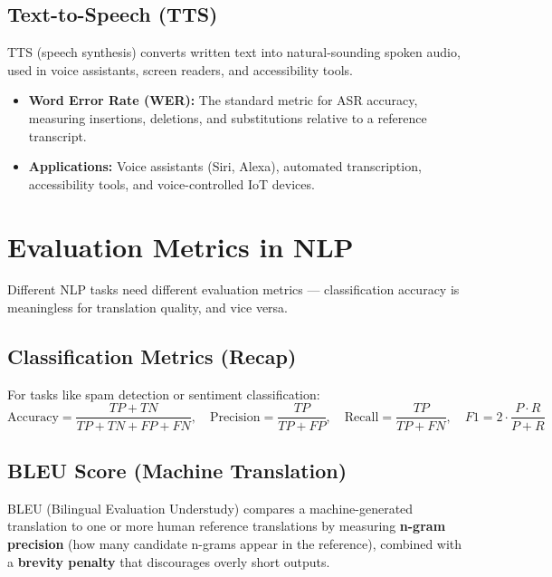 \documentclass[11pt,a4paper]{article}
\begin{document}
\subsection{Text-to-Speech (TTS)}
\begin{conceptbox}[TTS]
TTS (speech synthesis) converts written text into natural-sounding spoken audio, used in voice assistants, screen readers, and accessibility tools.
\end{conceptbox}

\begin{itemize}[leftmargin=*]
  \item \textbf{Word Error Rate (WER):} The standard metric for ASR accuracy, measuring insertions, deletions, and substitutions relative to a reference transcript.
  \item \textbf{Applications:} Voice assistants (Siri, Alexa), automated transcription, accessibility tools, and voice-controlled IoT devices.
\end{itemize}

\section{Evaluation Metrics in NLP}

\begin{definitionbox}
Different NLP tasks need different evaluation metrics --- classification accuracy is meaningless for translation quality, and vice versa.
\end{definitionbox}

\subsection{Classification Metrics (Recap)}
For tasks like spam detection or sentiment classification:
$$
\text{Accuracy}=\frac{TP+TN}{TP+TN+FP+FN}, \quad
\text{Precision}=\frac{TP}{TP+FP}, \quad
\text{Recall}=\frac{TP}{TP+FN}, \quad
F1=2\cdot\frac{P\cdot R}{P+R}
$$

\subsection{BLEU Score (Machine Translation)}
\begin{conceptbox}[BLEU]
BLEU (Bilingual Evaluation Understudy) compares a machine-generated translation to one or more human reference translations by measuring \textbf{n-gram precision} (how many candidate n-grams appear in the reference), combined with a \textbf{brevity penalty} that discourages overly short outputs.
\end{conceptbox}
\end{document}
